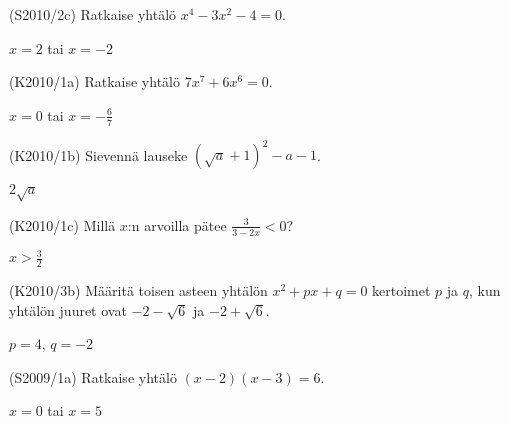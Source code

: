 \begin{tehtava}
(S2010/2c) Ratkaise yhtälö $x^4-3x^2-4=0$.
\begin{vastaus}
$x=2$ tai $x=-2$
\end{vastaus}
\end{tehtava}


\begin{tehtava}
(K2010/1a) Ratkaise yhtälö $7x^7+6x^6=0$.
\begin{vastaus}
$x=0$ tai $x=-\frac{6}{7}$
\end{vastaus}
\end{tehtava}

\begin{tehtava}
(K2010/1b) Sievennä lauseke $(\sqrt{a}+1)^2-a-1$.
\begin{vastaus}
$2\sqrt{a}$
\end{vastaus}
\end{tehtava}

\begin{tehtava}
(K2010/1c) Millä $x$:n arvoilla pätee $\frac{3}{3-2x}<0$?
\begin{vastaus}
$x>\frac{3}{2}$
\end{vastaus}
\end{tehtava}


\begin{tehtava}
(K2010/3b) Määritä toisen asteen yhtälön $x^2+px+q=0$ kertoimet $p$ ja $q$, kun yhtälön juuret ovat $-2-\sqrt{6}$ ja $-2+\sqrt{6}$.
\begin{vastaus}
$p=4$, $q=-2$
\end{vastaus}
\end{tehtava}

\begin{tehtava}
(S2009/1a) Ratkaise yhtälö $(x-2)(x-3)=6$. 
\begin{vastaus}
$x=0$ tai $x=5$
\end{vastaus}
\end{tehtava}

